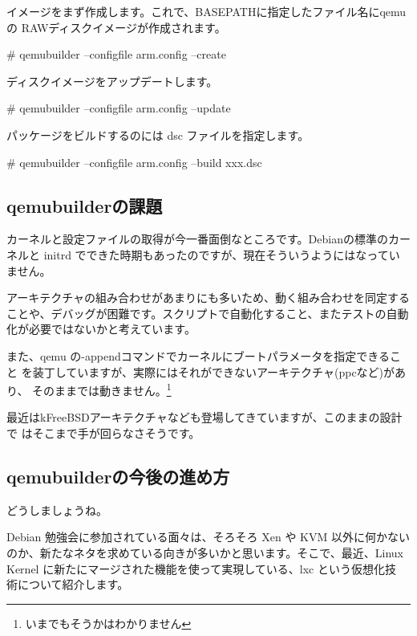 \documentclass[mingoth,a4paper]{jsarticle}
\begin{document}
イメージをまず作成します。これで、BASEPATHに指定したファイル名にqemuの
RAWディスクイメージが作成されます。

\begin{commandline}
# qemubuilder --configfile arm.config --create 
\end{commandline}

ディスクイメージをアップデートします。

\begin{commandline}
# qemubuilder --configfile arm.config --update
\end{commandline}

パッケージをビルドするのには dsc ファイルを指定します。

\begin{commandline}
# qemubuilder --configfile arm.config --build xxx.dsc
\end{commandline}

\subsection{qemubuilderの課題}

カーネルと設定ファイルの取得が今一番面倒なところです。Debianの標準のカー
ネルと initrd でできた時期もあったのですが、現在そういうようにはなってい
ません。

アーキテクチャの組み合わせがあまりにも多いため、動く組み合わせを同定する
ことや、デバッグが困難です。スクリプトで自動化すること、またテストの自動
化が必要ではないかと考えています。

また、qemu の-appendコマンドでカーネルにブートパラメータを指定できること
を装丁していますが、実際にはそれができないアーキテクチャ(ppcなど)があり、
そのままでは動きません。\footnote{いまでもそうかはわかりません}

最近はkFreeBSDアーキテクチャなども登場してきていますが、このままの設計で
はそこまで手が回らなさそうです。

\subsection{qemubuilderの今後の進め方}

どうしましょうね。

\label{sec:lxc}

Debian 勉強会に参加されている面々は、そろそろ Xen や KVM 以外に何かない
のか、新たなネタを求めている向きが多いかと思います。そこで、最近、Linux
Kernel に新たにマージされた機能を使って実現している、lxc という仮想化技
術について紹介します。
\end{document}
